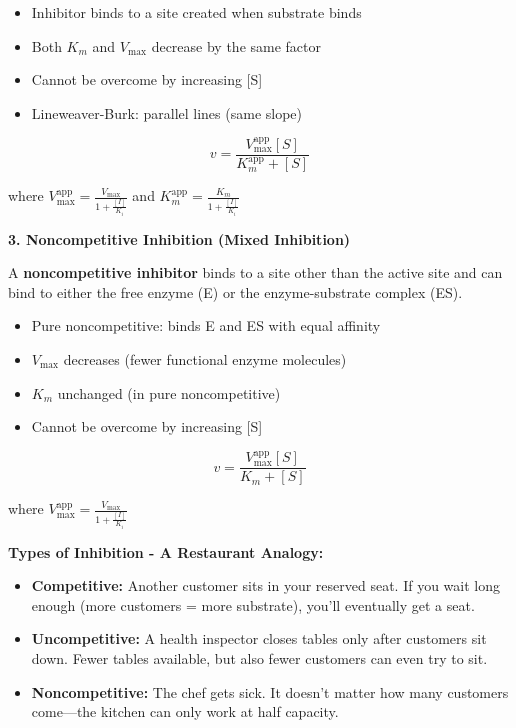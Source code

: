 \begin{itemize}
    \item Inhibitor binds to a site created when substrate binds
    \item Both $K_m$ and $V_{\max}$ decrease by the same factor
    \item Cannot be overcome by increasing [S]
    \item Lineweaver-Burk: parallel lines (same slope)
\end{itemize}

\[
v = \frac{V_{\max}^{\text{app}}[S]}{K_m^{\text{app}} + [S]}
\]

where $V_{\max}^{\text{app}} = \frac{V_{\max}}{1 + \frac{[I]}{K_i}}$ and $K_m^{\text{app}} = \frac{K_m}{1 + \frac{[I]}{K_i}}$

\textbf{3. Noncompetitive Inhibition (Mixed Inhibition)}

\begin{definition}
A \textbf{noncompetitive inhibitor} binds to a site other than the active site and can bind to either the free enzyme (E) or the enzyme-substrate complex (ES).
\end{definition}

\begin{itemize}
    \item Pure noncompetitive: binds E and ES with equal affinity
    \item $V_{\max}$ decreases (fewer functional enzyme molecules)
    \item $K_m$ unchanged (in pure noncompetitive)
    \item Cannot be overcome by increasing [S]
\end{itemize}

\[
v = \frac{V_{\max}^{\text{app}}[S]}{K_m + [S]}
\]

where $V_{\max}^{\text{app}} = \frac{V_{\max}}{1 + \frac{[I]}{K_i}}$

\begin{analogy}
\textbf{Types of Inhibition - A Restaurant Analogy:}
\begin{itemize}
    \item \textbf{Competitive:} Another customer sits in your reserved seat. If you wait long enough (more customers = more substrate), you'll eventually get a seat.
    \item \textbf{Uncompetitive:} A health inspector closes tables only after customers sit down. Fewer tables available, but also fewer customers can even try to sit.
    \item \textbf{Noncompetitive:} The chef gets sick. It doesn't matter how many customers come—the kitchen can only work at half capacity.
\end{itemize}
\end{analogy}

